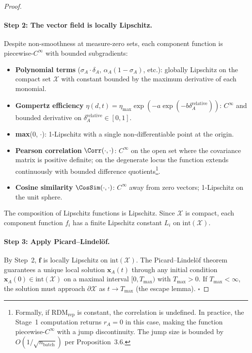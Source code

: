 \begin{proof}
\paragraph{Step 2: The vector field is locally Lipschitz.}
Despite non-smoothness at measure-zero sets, each component function is
piecewise-$C^\infty$ with bounded subgradients:
\begin{itemize}[nosep]
\item \textbf{Polynomial terms} ($\sigma_A \cdot \delta_A$, $\alpha_A(1-\sigma_A)$,
  etc.): globally Lipschitz on the compact set $\mathcal{X}$ with constant
  bounded by the maximum derivative of each monomial.
\item \textbf{Gompertz efficiency} $\eta(d,t) = \eta_{\max} \exp(-a \exp(-b \delta_A^{\text{relative}}))$:
  $C^\infty$ and bounded derivative on $\delta_A^{\text{relative}} \in [0,1]$.
\item \textbf{max}(0, $\cdot$): 1-Lipschitz with a single non-differentiable
  point at the origin.
\item \textbf{Pearson correlation} $\Corr(\cdot, \cdot)$: $C^\infty$ on
  the open set where the covariance matrix is positive definite; on the
  degenerate locus the function extends continuously with bounded
  difference quotients\footnote{Formally, if $\text{RDM}_{\text{rep}}$ is
  constant, the correlation is undefined. In practice, the Stage~1
  computation returns $r_A = 0$ in this case, making the function
  piecewise-$C^\infty$ with a jump discontinuity. The jump size is
  bounded by $O(1/\sqrt{n_{\text{batch}}})$ per Proposition~3.6.}.
\item \textbf{Cosine similarity} $\CosSim(\cdot,\cdot)$: $C^\infty$ away
  from zero vectors; 1-Lipschitz on the unit sphere.
\end{itemize}
The composition of Lipschitz functions is Lipschitz. Since $\mathcal{X}$
is compact, each component function $f_i$ has a finite Lipschitz constant
$L_i$ on $\text{int}(\mathcal{X})$.

\paragraph{Step 3: Apply Picard--Lindelöf.}
By Step~2, $\mathbf{f}$ is locally Lipschitz on $\text{int}(\mathcal{X})$.
The Picard--Lindelöf theorem guarantees a unique local solution
$\mathbf{x}_A(t)$ through any initial condition $\mathbf{x}_A(0) \in
\text{int}(\mathcal{X})$ on a maximal interval $[0, T_{\max})$ with
$T_{\max} > 0$. If $T_{\max} < \infty$, the solution must approach
$\partial\mathcal{X}$ as $t \to T_{\max}$ (the escape lemma).
$\square$
\end{proof}

